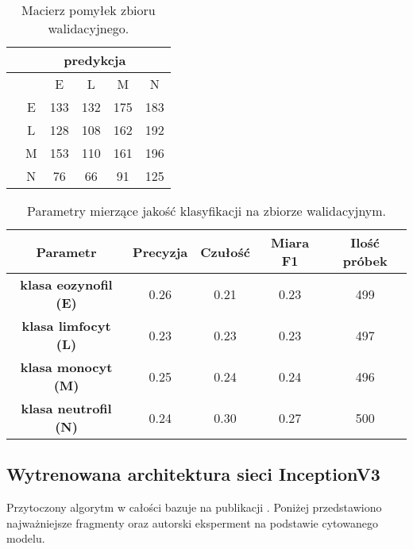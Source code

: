 {\begin{itemize}
\begin{table}[h!]
\centering
\caption[Short Heading]{Macierz pomyłek zbioru walidacyjnego.}
\label{tab:kaggle_2_conf_matrix}
\begin{tabular}{|c|c|c|c|c|c|}
\hline
\textbf{}                           & \multicolumn{5}{c|}{\textbf{predykcja}} \\ \hline
{\multirow{5}{*}{\rotatebox[origin=c]{90}{\textbf{klasa}}}} &         & E       & L        & M      & N       \\ \cline{2-6} 
                                    & E       & 133       & 132      & 175      & 183      \\ \cline{2-6} 
                                    & L       & 128       & 108      & 162      & 192      \\ \cline{2-6} 
                                    & M       & 153       & 110      & 161      & 196      \\ \cline{2-6} 
                                    & N       & 76       & 66      & 91      & 125       \\ \hline
\end{tabular}
\end{table}

\end{itemize}
}

\begin{table}[h!]
\centering
\caption[Short Heading]{Parametry mierzące jakość klasyfikacji na zbiorze walidacyjnym.}
\label{tab:kaggle_2_params_val}
\begin{tabular}{|c|c|c|c|c|}
\hline
\textbf{Parametr}                               & \textbf{Precyzja} & \textbf{Czułość} & \textbf{Miara F1} & \textbf{Ilość próbek} \\ \hline
\textbf{klasa eozynofil (E)} & 0.26   & 0.21   & 0.23 & 499  \\ \hline
\textbf{klasa limfocyt (L)} & 0.23  & 0.23 & 0.23  & 497  \\ \hline
\textbf{klasa monocyt (M)} & 0.25   & 0.24    & 0.24  & 496  \\ \hline
\textbf{klasa neutrofil (N)} & 0.24   & 0.30    & 0.27  & 500  \\ \hline
\end{tabular}
\end{table}

\subsection{Wytrenowana architektura sieci InceptionV3}
Przytoczony algorytm w całości bazuje na publikacji \cite{kaggle_3}. Poniżej przedstawiono najważniejsze fragmenty oraz autorski eksperment na podstawie cytowanego modelu.

